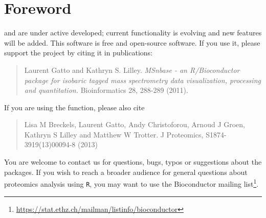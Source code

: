 \section*{Foreword}


 and  are under active developed; 
current functionality is evolving and new features will be added. 
This software is free and open-source software. 
If you use it, please support the project by citing it in publications:

\begin{quote}
  Laurent Gatto and Kathryn S. Lilley. \emph{MSnbase - an R/Bioconductor 
    package for isobaric tagged mass spectrometry data visualization,
    processing and quantitation.} Bioinformatics 28, 288-289 (2011).
\end{quote}

If you are using the  function, please also cite

\begin{quote}
  Lisa M Breckels, Laurent Gatto, Andy Christoforou, Arnoud J Groen, 
  Kathryn S Lilley and Matthew W Trotter. 
  J Proteomics, S1874-3919(13)00094-8 (2013)
\end{quote}

You are welcome to contact us for questions, bugs, typos or suggestions about the packages.
If you wish to reach a broader audience for general questions about proteomics analysis using 
\texttt{R}, you may want to use the Bioconductor mailing 
list\footnote{\url{https://stat.ethz.ch/mailman/listinfo/bioconductor}}.
